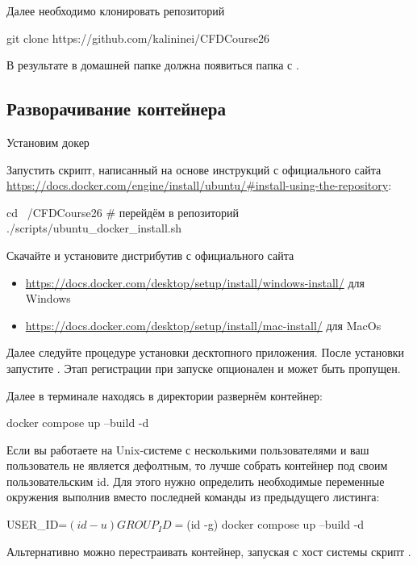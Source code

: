 Далее необходимо клонировать репозиторий

\begin{shelloutput}
git clone https://github.com/kalininei/CFDCourse26
\end{shelloutput}

В результате в домашней папке должна появиться папка с .

\subsection{Разворачивание контейнера}

Установим докер

\begin{tcolorbox}[osstyle, title=Ubuntu+apt]
Запустить скрипт, написанный на основе инструкций с официального сайта \url{https://docs.docker.com/engine/install/ubuntu/#install-using-the-repository}:
\begin{shelloutput}
cd ~/CFDCourse26    # перейдём в репозиторий
./scripts/ubuntu_docker_install.sh
\end{shelloutput}
\end{tcolorbox}

\begin{tcolorbox}[osstyle, title=Windows/MacOs+DockerDesktop]
Скачайте и установите дистрибутив с официального сайта 
\begin{itemize}
\item \url{https://docs.docker.com/desktop/setup/install/windows-install/} для Windows
\item \url{https://docs.docker.com/desktop/setup/install/mac-install/} для MacOs
\end{itemize}
Далее следуйте процедуре установки десктопного приложения.
После установки запустите .
Этап регистрации при запуске опционален и может быть пропущен.
\end{tcolorbox}

Далее в терминале находясь в директории  развернём контейнер:
\begin{shelloutput}
docker compose up --build -d
\end{shelloutput}
Если вы работаете на Unix-системе с несколькими пользователями и ваш пользователь не является дефолтным, то лучше собрать контейнер под своим пользовательским id. Для этого нужно определить необходимые переменные окружения выполнив вместо последней команды из предыдущего листинга:
\begin{shelloutput}
USER_ID=$(id -u) GROUP_ID=$(id -g) docker compose up --build -d
\end{shelloutput}
Альтернативно можно перестраивать контейнер, запуская с хост системы скрипт .

